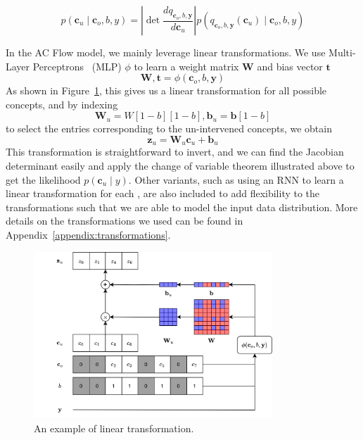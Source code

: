 \[p(\mathbf{c}_u \mid \mathbf{c}_o, b, y) = \left | 
\mathop{\mathrm{det}} \frac{d q_{\mathbf{c}_o, b, \mathbf{y}}}{d \mathbf{c}_u}
\right | p(q_{\mathbf{c}_o, b, \mathbf{y}}(\mathbf{c}_u) \mid \mathbf{c}_o, b, y)\]

In the AC Flow model, we mainly leverage
linear transformations. We use Multi-Layer Perceptrons~\cite{feedforward} (MLP) 
$\phi$ to learn 
a weight matrix $\mathbf{W}$ and bias vector $\mathbf{t}$
\[\mathbf{W}, \mathbf{t} = \phi(\mathbf{c}_o, b, \mathbf{y})\]
As shown in Figure~\ref{fig:linear-transformation},
this gives us a linear transformation for all possible concepts,
and by indexing 
\[\mathbf{W}_{u} = W[1-b][1-b], \mathbf{b}_{u} = \mathbf{b}[1-b]\]
to select the entries corresponding to the un-intervened concepts, we obtain
\[\mathbf{z}_u = \mathbf{W}_{u}\mathbf{c}_u + \mathbf{b}_{u}\]
 This transformation is 
straightforward to invert, and we can find the Jacobian determinant easily and apply the change of variable
theorem illustrated above to get the likelihood $p(\mathbf{c}_u \mid y)$.
Other variants, such as using an RNN to learn a linear transformation
for each , are also included to add flexibility to the transformations such that
we are able to model the input data distribution. More details on the transformations
we used can be found in Appendix~\ref{appendix:transformations}.

\begin{figure}[!ht]
    \centering
    \includegraphics[width=0.8\textwidth]{figs/method/transformations.png}
    \caption{An example of linear transformation.}
    \label{fig:linear-transformation}
\end{figure}

